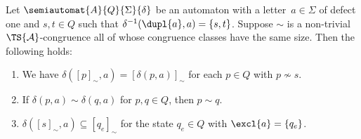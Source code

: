 \begin{proposition} \label{syncmax:prop:congruences-defect-one}
	Let $\semiautomat{A}{Q}{\Sigma}{\delta}$
	be an automaton with a letter~$a \in \Sigma$ of defect one
	and $s,t \in Q$ such that $\delta^{-1}(\dupl{a}, a) = \{s,t\}$.
	Suppose $\sim$ is a non-trivial $\TS{\mathcal A}$-congruence all of whose
	congruence classes have the same size. Then the following holds:
	\begin{enumerate}
		\item \label{syncmax:prop:congruences-defect-one:1} We have $\delta([p]_{\sim}, a) = [\delta(p, a)]_{\sim}$ for each $p \in Q$ with $p \not\sim s$.
		
		\item \label{syncmax:prop:congruences-defect-one:2} If $\delta(p, a) \sim \delta(q, a)$ for 
		$p,q \in Q$, then $p \sim q$.
		
		
		\item \label{syncmax:prop:congruences-defect-one:4} $\delta([s]_{\sim}, a) \subseteq [q_e]_{\sim}$ for the 
		state $q_e \in Q$ with $\excl{a} = \{q_e\}$.		
	\end{enumerate}
\end{proposition}
